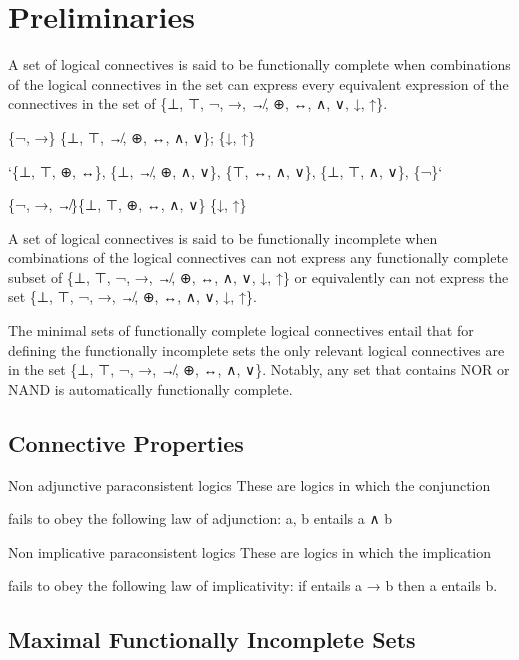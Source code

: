 \hypertarget{preliminaries}{%
\section{Preliminaries}\label{preliminaries}}

A set of logical connectives is said to be functionally complete when
combinations of the logical connectives in the set can express every
equivalent expression of the connectives in the set of \{⊥, ⊤, ¬, →, ↛,
⊕, ↔, ∧, ∨, ↓, ↑\}.

\{¬, →\} \{⊥, ⊤, ↛, ⊕, ↔, ∧, ∨\}; \{↓, ↑\}

`\{⊥, ⊤, ⊕, ↔\}, \{⊥, ↛, ⊕, ∧, ∨\}, \{⊤, ↔, ∧, ∨\}, \{⊥, ⊤, ∧, ∨\},
\{¬\}`

\{¬, →, ↛\}\{⊥, ⊤, ⊕, ↔, ∧, ∨\} \{↓, ↑\}

A set of logical connectives is said to be functionally incomplete when
combinations of the logical connectives can not express any functionally
complete subset of \{⊥, ⊤, ¬, →, ↛, ⊕, ↔, ∧, ∨, ↓, ↑\} or equivalently
can not express the set \{⊥, ⊤, ¬, →, ↛, ⊕, ↔, ∧, ∨, ↓, ↑\}.

The minimal sets of functionally complete logical connectives entail
that for defining the functionally incomplete sets the only relevant
logical connectives are in the set \{⊥, ⊤, ¬, →, ↛, ⊕, ↔, ∧, ∨\}.
Notably, any set that contains NOR or NAND is automatically functionally
complete.

\hypertarget{connective-properties}{%
\subsection{Connective Properties}\label{connective-properties}}

Non adjunctive paraconsistent logics These are logics in which the
conjunction

fails to obey the following law of adjunction: a, b entails a ∧ b

Non implicative paraconsistent logics These are logics in which the
implication

fails to obey the following law of implicativity: if entails a → b then
a entails b.

\hypertarget{maximal-functionally-incomplete-sets}{%
\subsection{Maximal Functionally Incomplete
Sets}\label{maximal-functionally-incomplete-sets}}

